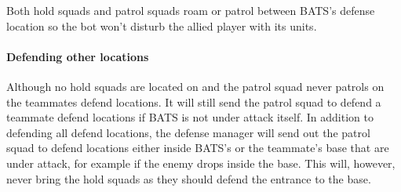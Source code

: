 Both hold squads and patrol squads roam or patrol between BATS’s defense location so the bot won’t disturb the allied player with its units.

\paragraph{Defending other locations}
Although no hold squads are located on and the patrol squad never patrols on the teammates defend locations. It will still send the patrol squad to defend a teammate defend locations if BATS is not under attack itself. In addition to defending all defend locations, the defense manager will send out the patrol squad to defend locations either inside BATS’s or the teammate's base that are under attack, for example if the enemy drops inside the base. This will, however, never bring the hold squads as they should defend the entrance to the base.
